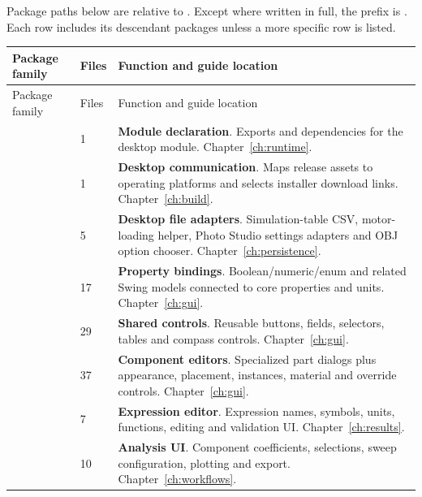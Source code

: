 Package paths below are relative to . Except where written in full, the prefix is . Each row includes its descendant packages unless a more specific row is listed.

\begin{longtable}{@{}L{4.6cm}L{0.8cm}L{10.2cm}@{}}\toprule Package family & Files & Function and guide location\\\midrule\endfirsthead

\toprule Package family & Files & Function and guide location\\\midrule\endhead

 & 1 & \textbf{Module declaration}. Exports and dependencies for the desktop module. Chapter~\ref{ch:runtime}.\\

 & 1 & \textbf{Desktop communication}. Maps release assets to operating platforms and selects installer download links. Chapter~\ref{ch:build}.\\

 & 5 & \textbf{Desktop file adapters}. Simulation-table CSV, motor-loading helper, Photo Studio settings adapters and OBJ option chooser. Chapter~\ref{ch:persistence}.\\

 & 17 & \textbf{Property bindings}. Boolean/numeric/enum and related Swing models connected to core properties and units. Chapter~\ref{ch:gui}.\\

 & 29 & \textbf{Shared controls}. Reusable buttons, fields, selectors, tables and compass controls. Chapter~\ref{ch:gui}.\\

 & 37 & \textbf{Component editors}. Specialized part dialogs plus appearance, placement, instances, material and override controls. Chapter~\ref{ch:gui}.\\

 & 7 & \textbf{Expression editor}. Expression names, symbols, units, functions, editing and validation UI. Chapter~\ref{ch:results}.\\

 & 10 & \textbf{Analysis UI}. Component coefficients, selections, sweep configuration, plotting and export. Chapter~\ref{ch:workflows}.\\


\end{longtable}

